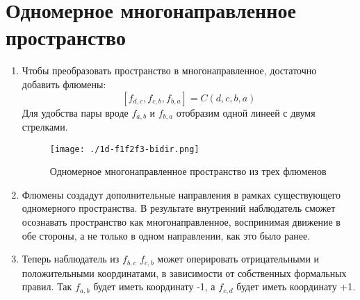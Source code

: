 \documentclass[final]{article}
\begin{document}
    \section{Одномерное многонаправленное пространство}

        \begin{enumerate}

            \item Чтобы преобразовать пространство в многонаправленное, достаточно 
            добавить флюмены: \[ [f_{d,c}, f_{c,b}, f_{b,a}]=C(d,c,b,a) \] Для 
            удобства пары вроде \( f_{a,b} \) и \(f_{b,a}\) отобразим одной линеей с 
            двумя стрелками.

            \begin{figure}[H]
                \centering
                \texttt{[image: ./1d-f1f2f3-bidir.png]}
                \caption{Одномерное многонаправленное пространство из трех флюменов}
                \label{fig:image}
            \end{figure}

            \item Флюмены создадут дополнительные направления в рамках существующего 
            одномерного пространства. В результате внутренний наблюдатель сможет 
            осознавать пространство как многонаправленное, воспринимая движение в 
            обе стороны, а не только в одном направлении, как это было ранее.

            \item Теперь наблюдатель из \(f_{b,c}\) \(f_{c,b}\) может оперировать 
            отрицательными и положительными координатами, в зависимости от 
            собственных формальных правил. Так \(f_{a,b}\) будет иметь координату 
            -1, а \(f_{c,d}\) будет иметь координату +1.

        \end{enumerate}
\end{document}
